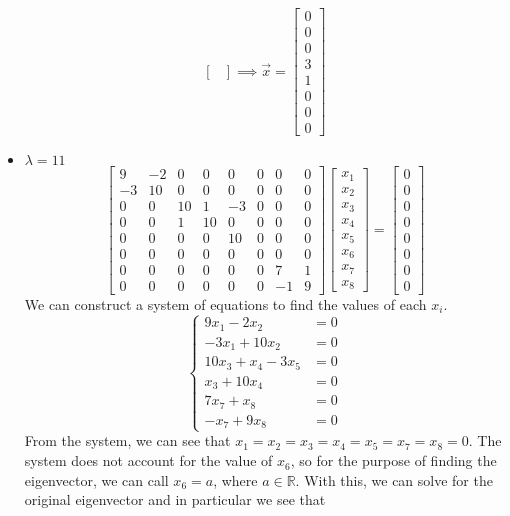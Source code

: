 \documentclass{report}
\begin{document}
\begin{itemize}
$$\begin{bmatrix}
\end{bmatrix} \implies
\vec{x} = \begin{bmatrix}
0 \\ 0 \\ 0 \\ 3 \\ 1 \\ 0 \\ 0 \\ 0
\end{bmatrix}
$$ 
\item $\lambda = 11$
$$
\begin{bmatrix}
9&-2&0&0&0&0&0&0\\
-3&10&0&0&0&0&0&0\\
0&0&10&1&-3&0&0&0\\
0&0&1&10&0&0&0&0\\
0&0&0&0&10&0&0&0\\
0&0&0&0&0&0&0&0\\
0&0&0&0&0&0&7&1\\
0&0&0&0&0&0&-1&9
\end{bmatrix}
\begin{bmatrix}
x_1 \\ x_2 \\ x_3 \\ x_4 \\ x_5 \\ x_6 \\ x_7 \\ x_8
\end{bmatrix} = \begin{bmatrix}
0 \\ 0 \\ 0 \\ 0 \\ 0 \\ 0 \\ 0 \\ 0
\end{bmatrix}
$$
We can construct a system of equations to find the values of each $x_i$.
$$
\left\{
\begin{aligned}
9x_1 - 2x_2 & = 0 \\
-3x_1 + 10x_2 & = 0 \\
10x_3 + x_4-3x_5 & = 0 \\
x_3 + 10x_4 & = 0 \\
7x_7 + x_8 & = 0 \\
-x_7 + 9x_8 & = 0
\end{aligned}
\right.
$$
From the system,  we can see that $x_1 = x_2 = x_3 = x_4 = x_ 5 = x_7 = x_8 = 0$.  The system does not account for the value of $x_6$,  so for the purpose of finding the eigenvector,  we can call $x_6 = a$,  where $a\in\mathbb{R}$.  With this,  we can solve for the original eigenvector and in particular we see that

\end{itemize}
\end{document}
